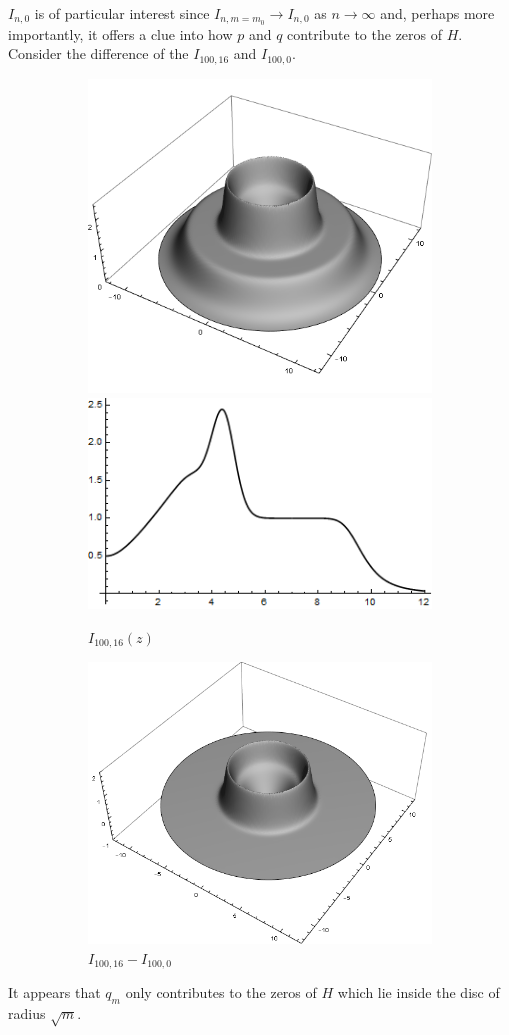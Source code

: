 \documentclass[12pt]{amsart}
\theoremstyle{remark}
\begin{document}
$I_{n,0}$ is of particular interest since $I_{n,m=m_0}\rightarrow I_{n,0}$ as $n\rightarrow\infty$ and, perhaps more importantly, it offers a clue into how $p$ and $q$ contribute to the zeros of $H$.
Consider the difference of the $I_{100,16}$ and $I_{100,0}$. 
\begin{figure}[ht]\label{fig:alphan}
\begin{subfigure}[b]{.55\textwidth}\label{alphan1}
\includegraphics[width=.45\textwidth]{./img/HarmonicPolyPlotsn100m16}
\quad
\includegraphics[width=.45\textwidth]{./img/HarmonicPolyPlotsn100m162D}
\caption{$I_{100,16}(z)$}
\end{subfigure}
\hspace{-.04\textwidth}
\begin{subfigure}[b]{.27\textwidth}\label{alphan2}
\includegraphics[width=\textwidth]{./img/HarmonicPolyPlotsn100m16SubtractAnalytic}
\caption{$I_{100,16}-I_{100,0}$}
\end{subfigure}
\caption{}
\end{figure}
It appears that $q_m$ only contributes to the zeros of $H$ which lie inside the disc of radius $\sqrt{m}$.
\end{document}
